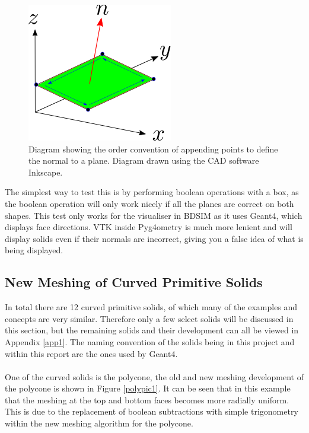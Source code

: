 \documentclass[12pt,a4paper]{article}
\begin{document}
\begin{figure}[h!]
\centering
\includegraphics[scale=0.75]{Images//append_points//Point_Appending_Order.png}
\caption[width=\columnwidth]{Diagram showing the order convention of appending points to define the normal to a plane. Diagram drawn using the CAD software Inkscape.}
\label{pointsorder}
\end{figure}
\noindent The simplest way to test this is by performing boolean operations with a box, as the boolean operation will only work nicely if all the planes are correct on both shapes. This test only works for the visualiser in BDSIM as it uses Geant4, which displays face directions. VTK inside Pyg4ometry is much more lenient and will display solids even if their normals are incorrect, giving you a false idea of what is being displayed.

\subsection{New Meshing of Curved Primitive Solids}
In total there are 12 curved primitive solids, of which many of the examples and concepts are very similar. Therefore only a few select solids will be discussed in this section, but the remaining solids and their development can all be viewed in Appendix \ref{app1}. The naming convention of the solids being in this project and within this report are the ones used by Geant4.
\\\\
One of the curved solids is the polycone, the old and new meshing development of the polycone is shown in Figure \ref{polypic1}. It can be seen that in this example that the meshing at the top and bottom faces becomes more radially uniform. This is due to the replacement of boolean subtractions with simple trigonometry within the new meshing algorithm for the polycone.
\end{document}
